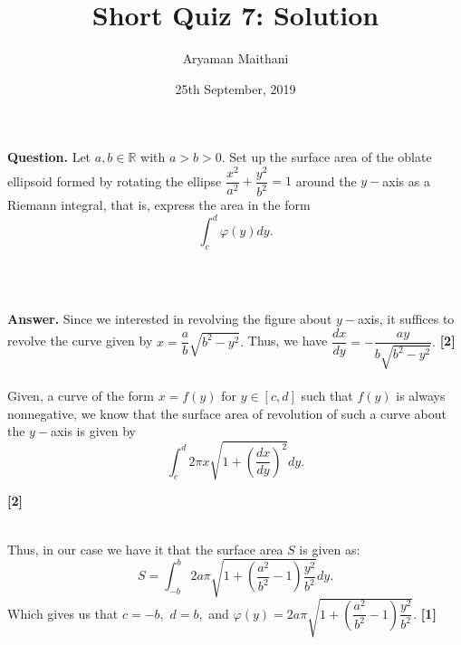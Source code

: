 \documentclass{article}
\title{Short Quiz 7: Solution}      %
\author{Aryaman Maithani}
\date{25th September, 2019}  		 %
\begin{document}
\maketitle

\hrulefill

\textbf{Question.} Let $a, b \in \mathbb{R}$ with $a > b > 0.$ Set up the surface area of the oblate ellipsoid formed by rotating the ellipse $\dfrac{x^2}{a^2} + \dfrac{y^2}{b^2} = 1$ around the $y-$axis as a Riemann integral, that is, express the area in the form 
\[\int_{c}^{d} \varphi(y) dy. \]
\begin{flushright}
	[5]\\~\\
\end{flushright}

\hrulefill

\textbf{Answer.} Since we interested in revolving the figure about $y-$axis, it suffices to revolve the curve given by $x = \dfrac{a}{b}\sqrt{b^2 - y^2}.$ Thus, we have $\dfrac{dx}{dy} = -\dfrac{ay}{b\sqrt{b^2 - y^2}}.$ \hfill \textbf{[2]}\\~\\
Given, a curve of the form $x = f(y)$ for $y \in [c, d]$ such that $f(y)$ is always nonnegative, we know that the surface area of revolution of such a curve about the $y-$axis is given by
\[\int_{c}^{d} 2\pi x\sqrt{1 + \left(\dfrac{dx}{dy}\right)^2} dy. \]
\begin{flushright}
	\textbf{[2]}\\~\\
\end{flushright}
Thus, in our case we have it that the surface area $S$ is given as:
\[S = \int_{-b}^{b} 2a\pi\sqrt{1 + \left(\dfrac{a^2}{b^2} - 1\right)\dfrac{y^2}{b^2}} dy. \]
Which gives us that $c = -b,$ $d = b,$ and $\varphi(y) = 2a\pi\sqrt{1 + \left(\dfrac{a^2}{b^2} - 1\right)\dfrac{y^2}{b^2}}.$ \hfill \textbf{[1]}

\hrulefill

\vspace{0.2 cm}
\end{document}
